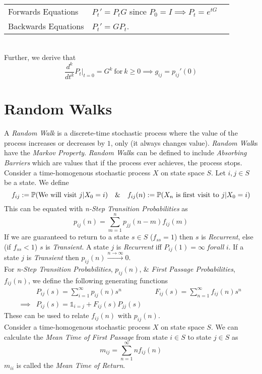 \documentclass[11pt,a4paper]{article}
\begin{document}
\begin{tabular}{lll}
Forwards Equations&$P_t'=P_tG$ since $P_0=I\implies P_t=e^{tG}$\\
Backwards Equations&$P_t'=GP_t$.
\end{tabular}\\
Further, we derive that
$$\frac{d^k}{dt^k}P_t\bigg\vert_{t=0}=G^k\ \mathrm{for}\ k\geq0\implies g_{ij}=p_{ij}'(0)$$

\section{Random Walks}

A \textit{Random Walk} is a discrete-time stochastic process where the value of the process increases or decreases by $1$, only (it always changes value). \textit{Random Walk}s have the \textit{Markov Property}. \textit{Random Walk}s can be defined to include \textit{Absorbing Barriers} which are values that if the process ever achieves, the process stops.\\

Consider a time-homogenous stochastic process $X$ on state space $S$. Let $i,j\in S$ be a state. We define
$$f_{ij}:=\prob(\mathrm{We\ will\ visit}\ j|X_0=i)\quad\&\quad f_{ij}(n):=\prob(X_n\ \mathrm{is\ first\ visit\ to\ }j|X_0=i)$$
This can be equated with \textit{n-Step Transition Probabilities} as
$$p_{ij}(n)=\sum_{m=1}^np_{jj}(n-m)f_{ij}(m)$$
If we are guaranteed to return to a state $s\in S$ (\ie $f_{ss}=1$) then $s$ is \textit{Recurrent}, else (\ie if $f_{ss}<1$) $s$ is \textit{Transient}. A state $j$ is \textit{Recurrent} iff $P_{ij}(1)=\infty\ forall\ i$. If a state $j$ is \textit{Transient} then $p_{ij}(n)\xrightarrow{n\to\infty}0$.\\

For \textit{n-Step Transition Probabilities}, $p_{ij}(n)$, \& \textit{First Passage Probabilities}, $f_{ij}(n)$, we define the following generating functions
\[\begin{array}{lll}
&P_{ij}(s)=\sum_{i=1}^\infty p_{ij}(n)s^n&\quad F_{ij}(s)=\sum_{n=1}^\infty f_{ij}(n)s^n\\
\implies&P_{ij}(s)=\mathds{1}_{i=j}+F_{ij}(s)P_{jj}(s)
\end{array}\]
These can be used to relate $f_{ij}(n)$ with $p_{ij}(n)$.\\

Consider a time-homogenous stochastic process $X$ on state space $S$. We can calculate the \textit{Mean Time of First Passage} from state $i\in S$ to state $j\in S$ as
$$m_{ij}=\sum_{n=1}^\infty nf_{ij}(n)$$
\nb $m_{ii}$ is called the \textit{Mean Time of Return}.\\
\end{document}
